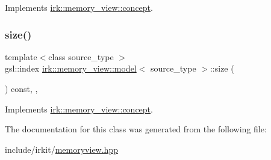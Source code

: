 Implements \mbox{\hyperlink{structirk_1_1memory__view_1_1concept_a65c761925c104cfd049dc5de3d800f37}{irk\+::memory\+\_\+view\+::concept}}.

\mbox{\label{classirk_1_1memory__view_1_1model_a88bdaaf00f71b733bb67ea912ed78251}} 
\subsubsection{\texorpdfstring{size()}{size()}}
{\footnotesize\ttfamily template$<$class source\+\_\+type $>$ \\
gsl\+::index \mbox{\hyperlink{classirk_1_1memory__view_1_1model}{irk\+::memory\+\_\+view\+::model}}$<$ source\+\_\+type $>$\+::size (\begin{DoxyParamCaption}{ }\end{DoxyParamCaption}) const\hspace{0.3cm}{\ttfamily [inline]}, {\ttfamily [override]}, {\ttfamily [virtual]}}



Implements \mbox{\hyperlink{structirk_1_1memory__view_1_1concept_ae280e124e776a61562f6a97b2fa7d655}{irk\+::memory\+\_\+view\+::concept}}.



The documentation for this class was generated from the following file\+:\begin{DoxyCompactItemize}
\item 
include/irkit/\mbox{\hyperlink{memoryview_8hpp}{memoryview.\+hpp}}\end{DoxyCompactItemize}
